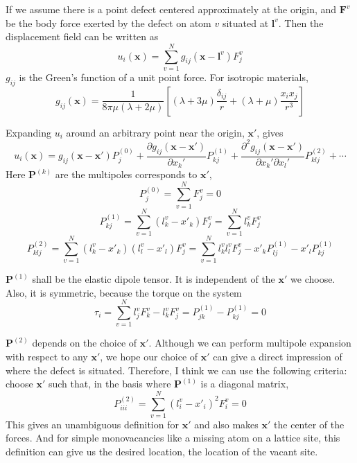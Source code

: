\documentclass{letter}
\begin{document}
If we assume there is a point defect centered approximately at the origin, and $\bm{F}^{v}$ be the body force exerted by the defect on atom $v$ situated at $\bm{l}^v$.
Then the displacement field can be written as
$$ u_i(\bm{x}) = \sum_{v=1}^{N} g_{ij}(\bm{x}-\bm{l}^v) F_j^v $$
$g_{ij}$ is the Green's function of a unit point force.
For isotropic materials,
$$ g_{ij}(\bm{x}) = \frac{1}{8\pi\mu(\lambda+2\mu)}\left[(\lambda+3\mu)\frac{\delta_{ij}}{r}+(\lambda+\mu)\frac{x_ix_j}{r^3}\right] $$

Expanding $u_i$ around an arbitrary point near the origin, $\bm{x'}$, gives
$$ u_i(\bm{x}) 
= g_{ij}(\bm{x}-\bm{x'}) P_j^{(0)} 
 + \frac{\partial g_{ij}(\bm{x}-\bm{x'})}{\partial x_k'} P_{kj}^{(1)}
 + \frac{\partial^2 g_{ij}(\bm{x}-\bm{x'})}{\partial x_k' \partial x_l'} P_{klj}^{(2)}
 + \cdots
$$
Here $\bm{P}^{(k)}$ are the multipoles corresponds to $\bm{x'}$, 
$$ P_j^{(0)} = \sum_{v=1}^N F_j^v = 0 $$
$$ P_{kj}^{(1)} = \sum_{v=1}^N (l_k^v-x'_k) F_j^v = \sum_{v=1}^N l_k^v F_j^v $$
$$ P_{klj}^{(2)} 
 = \sum_{v=1}^N (l_k^v-x'_k) (l_l^v-x'_l) F_j^v 
 = \sum_{v=1}^N l_k^vl_l^v F_j^v - x'_k P_{lj}^{(1)} - x'_l P_{kj}^{(1)} $$

$\bm{P}^{(1)}$ shall be the elastic dipole tensor.
It is independent of the $\bm{x'}$ we choose.
Also, it is symmetric, because the torque on the system
$$ \tau_i = \sum_{v=1}^N l_j^v F_k^v - l_k^v F_j^v = P_{jk}^{(1)} - P_{kj}^{(1)} = 0 $$

$\bm{P}^{(2)}$ depends on the choice of $\bm{x'}$.
Although we can perform multipole expansion with respect to any $\bm{x'}$, we hope our choice of $\bm{x'}$ can give a direct impression of where the defect is situated.
Therefore, I think we can use the following criteria:
choose $\bm{x'}$ such that, in the basis where $\bm{P}^{(1)}$ is a diagonal matrix,
$$ P_{iii}^{(2)} = \sum_{v=1}^N (l_i^v-x'_i)^2 F_i^v = 0 $$
This gives an unambiguous definition for $\bm{x'}$ and also makes $\bm{x'}$ the center of the forces.
And for simple monovacancies like a missing atom on a lattice site, this definition can give us the desired location, the location of the vacant site.
\end{document}
